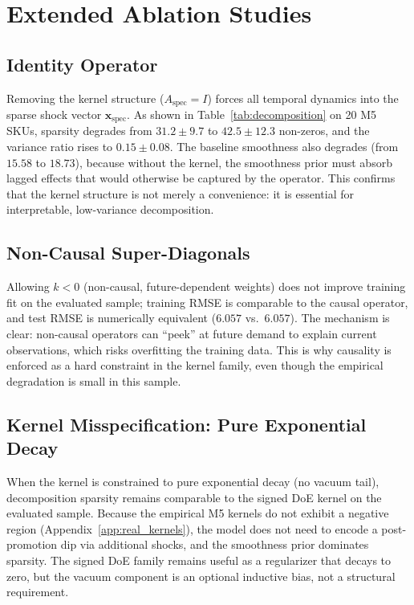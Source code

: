 \documentclass[10pt]{article} %
\theoremstyle{plain}
\theoremstyle{definition}
\newcommand{\xspec}{\mathbf{x}_{\text{spec}}}
\newcommand{\Aspec}{A_{\text{spec}}}
\begin{document}
\section{Extended Ablation Studies}
\label{app:ablation}

\subsection{Identity Operator}
\label{app:ablation_identity}

Removing the kernel structure ($\Aspec = I$) forces all temporal dynamics into the sparse shock vector $\xspec$. As shown in Table~\ref{tab:decomposition} on 20 M5 SKUs, sparsity degrades from $31.2 \pm 9.7$ to $42.5 \pm 12.3$ non-zeros, and the variance ratio rises to $0.15 \pm 0.08$. The baseline smoothness also degrades (from $15.58$ to $18.73$), because without the kernel, the smoothness prior must absorb lagged effects that would otherwise be captured by the operator. This confirms that the kernel structure is not merely a convenience: it is essential for interpretable, low-variance decomposition.

\subsection{Non-Causal Super-Diagonals}
\label{app:ablation_noncausal}

Allowing $k < 0$ (non-causal, future-dependent weights) does not improve training fit on the evaluated sample; training RMSE is comparable to the causal operator, and test RMSE is numerically equivalent ($6.057$ vs.~$6.057$). The mechanism is clear: non-causal operators can ``peek'' at future demand to explain current observations, which risks overfitting the training data. This is why causality is enforced as a hard constraint in the kernel family, even though the empirical degradation is small in this sample.

\subsection{Kernel Misspecification: Pure Exponential Decay}
\label{app:ablation_exponential}

When the kernel is constrained to pure exponential decay (no vacuum tail), decomposition sparsity remains comparable to the signed DoE kernel on the evaluated sample. Because the empirical M5 kernels do not exhibit a negative region (Appendix~\ref{app:real_kernels}), the model does not need to encode a post-promotion dip via additional shocks, and the smoothness prior dominates sparsity. The signed DoE family remains useful as a regularizer that decays to zero, but the vacuum component is an optional inductive bias, not a structural requirement.
\end{document}
